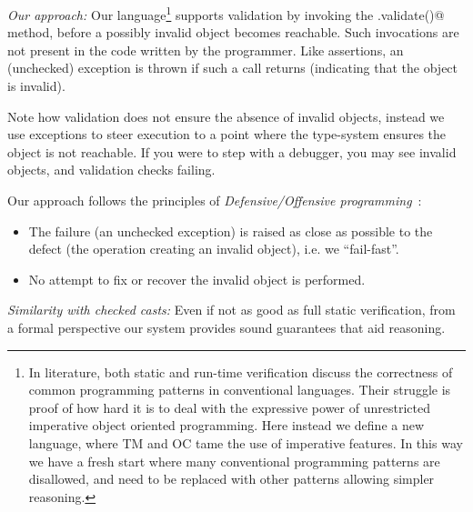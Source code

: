 \loseSpace
\noindent\textit{Our approach:}
Our language\footnote{
In literature, both static and run-time verification discuss
the correctness of common programming patterns in conventional languages.
Their struggle is proof of how hard it is to deal with the expressive power of unrestricted imperative object oriented programming.
 Here instead we define a new language, where TM and OC tame the use of imperative features. In this way
we have a fresh start where
many conventional programming patterns are disallowed,
and need to be replaced with other patterns allowing simpler reasoning.
} supports validation by invoking the \Q@.validate()@ method, before a possibly invalid object becomes reachable. Such invocations are not present in the code written by the programmer. 
Like assertions, an (unchecked) exception is thrown if such a call returns \Q@false@ (indicating that the object is invalid).

Note how validation does not ensure the absence of invalid objects, instead we use exceptions to steer execution to a point where the type-system ensures the object is not reachable.
If you were to step with a debugger, you may see invalid objects, and validation checks failing.

\noindent Our approach follows the principles of \emph{Defensive/Offensive programming}~\cite{WikiDefensive}:
\begin{itemize}
\item The failure (an unchecked exception)
is raised as close as possible to the defect (the operation creating an invalid object), i.e. we ``fail-fast''.
\item No attempt to fix or recover the invalid object is performed.
\end{itemize}


%
\noindent\textit{Similarity with checked casts:}
Even if not as good as full static verification, from a formal perspective
our system provides sound guarantees that aid reasoning.

